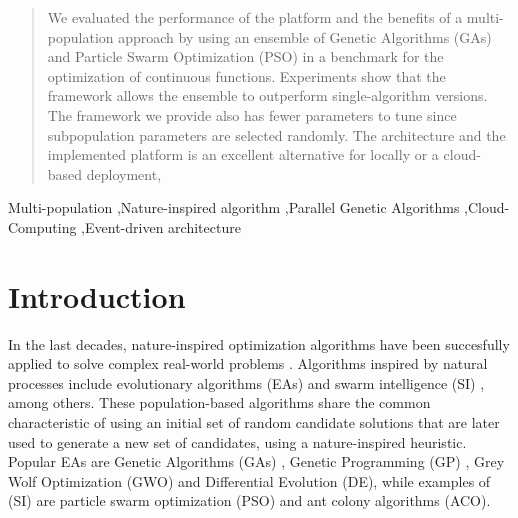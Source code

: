 \documentclass[review]{elsarticle}
\begin{document}
\begin{frontmatter}
\begin{abstract}
We
evaluated the performance of the platform and the benefits of a multi-population
approach by using an ensemble of Genetic Algorithms (GAs) and Particle Swarm
Optimization (PSO) in a benchmark for the optimization of continuous functions.
Experiments show that the framework allows the ensemble to outperform
single-algorithm versions. %
The framework we provide also has fewer parameters to
tune since subpopulation parameters are selected randomly. %
The architecture and
the implemented platform is an excellent alternative for locally or a
cloud-based deployment, %
\end{abstract}

\begin{keyword}
Multi-population \sep Nature-inspired algorithm \sep Parallel Genetic Algorithms \sep Cloud-Computing
\sep Event-driven architecture 
\end{keyword}

\end{frontmatter}

\linenumbers

\section{Introduction}

In the last decades, nature-inspired optimization algorithms have been succesfully
applied to solve complex real-world problems \cite{yang2014nature}. Algorithms
inspired by natural processes include evolutionary algorithms (EAs)
\cite{back1996evolutionary} and swarm intelligence (SI) \cite{kennedy2006swarm},
among others. These population-based algorithms share the common characteristic
of using an initial set of random candidate solutions that are later used to
generate a new set of candidates, using a nature-inspired heuristic. Popular EAs
are Genetic Algorithms (GAs) \cite{holland1992adaptation,eiben2003genetic}, 
Genetic Programming (GP) \cite{back1996evolutionary}, Grey Wolf Optimization
(GWO) and Differential Evolution (DE), while examples of (SI) are particle swarm
optimization (PSO) and ant colony algorithms (ACO).
\end{document}
